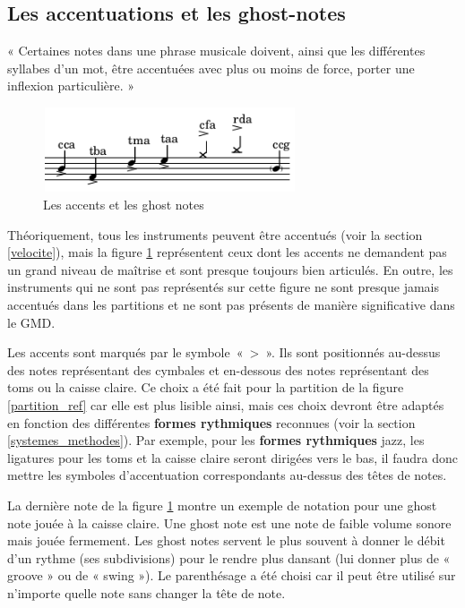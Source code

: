 \subsection*{Les accentuations et les ghost-notes}
« Certaines notes dans une phrase musicale doivent, ainsi que les différentes
syllabes d’un mot, être accentuées avec plus ou moins de force, porter une
inflexion particulière. » \cite{danhauser}
\begin{figure}[h]
\centering
\includegraphics[height=25mm, width=75mm]{
z_images/3_methodes/0_notation_de_la_batterie/8_accents_et_ghost-notes_0.png}
\caption{Les accents et les ghost notes}
\label{accents_et_gn}
\end{figure}

Théoriquement, tous les instruments peuvent être accentués (voir la section
\ref{velocite}), mais la figure \ref{accents_et_gn} représentent ceux dont les
accents ne demandent pas un grand niveau de maîtrise et sont presque toujours
bien articulés. En outre, les instruments qui ne sont pas représentés sur cette
figure ne sont presque jamais accentués dans les partitions et ne sont pas
présents de manière significative dans le GMD.

Les accents sont marqués par le symbole~«~>~». Ils sont positionnés au-dessus
des notes représentant des cymbales et en-dessous des notes représentant des
toms ou la caisse claire. Ce choix a été fait pour la partition de la figure
\ref{partition_ref} car elle est plus lisible ainsi, mais ces choix devront
être adaptés en fonction des différentes \textbf{formes rythmiques} reconnues
(voir la section \ref{systemes_methodes}). Par exemple, pour les
\textbf{formes rythmiques} jazz, les ligatures pour les toms et la caisse
claire seront dirigées vers le bas, il faudra donc mettre les symboles
d’accentuation correspondants au-dessus des têtes de notes.

La dernière note de la figure \ref{accents_et_gn} montre un exemple de notation
pour une ghost note jouée à la caisse claire. Une ghost note
\cite{lexique_drum} est une note de faible volume sonore mais jouée fermement.
Les ghost notes servent le plus souvent à donner le débit d’un rythme (ses
subdivisions) pour le rendre plus dansant (lui donner plus de « groove » ou de
« swing »). Le parenthésage a été choisi car il peut être utilisé sur n’importe
quelle note sans changer la tête de note.

